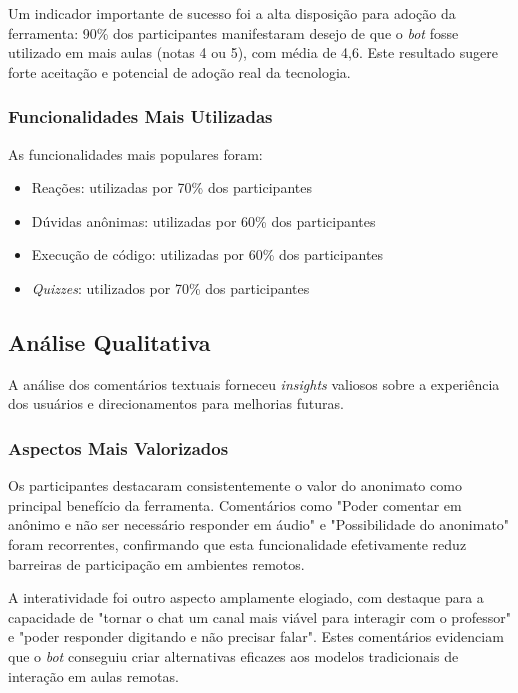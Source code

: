 Um indicador importante de sucesso foi a alta disposição para adoção da
ferramenta: 90\% dos participantes manifestaram desejo de que o \textit{bot}
fosse utilizado em mais aulas (notas 4 ou 5), com média de 4,6. Este resultado
sugere forte aceitação e potencial de adoção real da tecnologia.

\subsubsection{Funcionalidades Mais Utilizadas}

As funcionalidades mais populares foram:
\begin{itemize}
\item Reações: utilizadas por 70\% dos participantes
\item Dúvidas anônimas: utilizadas por 60\% dos participantes  
\item Execução de código: utilizadas por 60\% dos participantes
\item \textit{Quizzes}: utilizados por 70\% dos participantes
\end{itemize}

\subsection{Análise Qualitativa}
\label{subsec:analise-qual}

A análise dos comentários textuais forneceu \textit{insights} valiosos sobre a
experiência dos usuários e direcionamentos para melhorias futuras.

\subsubsection{Aspectos Mais Valorizados}

Os participantes destacaram consistentemente o valor do anonimato como principal
benefício da ferramenta. Comentários como "Poder comentar em anônimo e não ser
necessário responder em áudio" e "Possibilidade do anonimato" foram recorrentes,
confirmando que esta funcionalidade efetivamente reduz barreiras de participação
em ambientes remotos.

A interatividade foi outro aspecto amplamente elogiado, com destaque para a
capacidade de "tornar o chat um canal mais viável para interagir com o
professor" e "poder responder digitando e não precisar falar". Estes comentários
evidenciam que o \textit{bot} conseguiu criar alternativas eficazes aos modelos
tradicionais de interação em aulas remotas.

